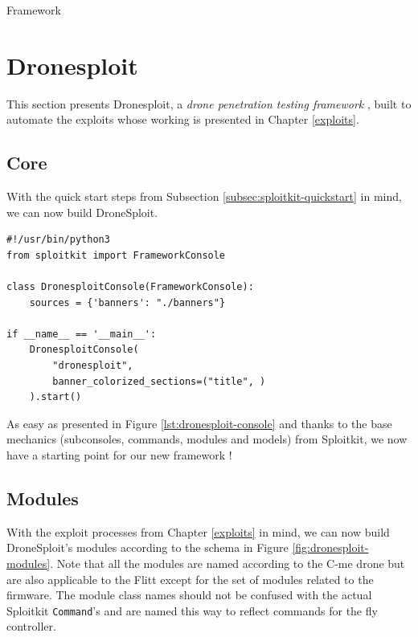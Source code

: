 \begin{chaptercover}{Framework}
\section{Dronesploit}

This section presents Dronesploit, a \textit{drone penetration testing framework} \cite{dronesploit}, built to automate the exploits whose working is presented in Chapter \ref{exploits}.

\subsection{Core}

With the quick start steps from Subsection \ref{subsec:sploitkit-quickstart} in mind, we can now build DroneSploit.

\begin{center}
\begin{lstlisting}[caption={Main file \texttt{main.py} of DroneSploit},emph={DronesploitConsole,FrameworkConsole}]
#!/usr/bin/python3
from sploitkit import FrameworkConsole

class DronesploitConsole(FrameworkConsole):
    sources = {'banners': "./banners"}

if __name__ == '__main__':
    DronesploitConsole(
        "dronesploit",
        banner_colorized_sections=("title", )
    ).start()
\end{lstlisting}\label{lst:dronesploit-console}
\end{center}

As easy as presented in Figure \ref{lst:dronesploit-console} and thanks to the base mechanics (subconsoles, commands, modules and models) from Sploitkit, we now have a starting point for our new framework !

\subsection{Modules}

With the exploit processes from Chapter \ref{exploits} in mind, we can now build DroneSploit's modules according to the schema in Figure \ref{fig:dronesploit-modules}. Note that all the modules are named according to the C-me drone but are also applicable to the Flitt except for the set of modules related to the firmware. The module class names should not be confused with the actual Sploitkit \texttt{Command}'s and are named this way to reflect commands for the fly controller.


\end{chaptercover}
